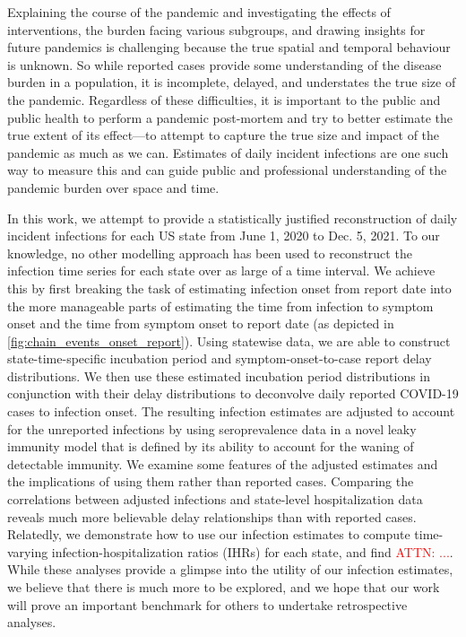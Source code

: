 \documentclass{article}
\newcommand{\attn }[1]{\textcolor{red}{ATTN: #1}}
\begin{document}
Explaining the course of the pandemic and investigating the effects of
interventions, the burden facing various subgroups, and drawing insights for
future pandemics is challenging because the true spatial and temporal behaviour
is unknown. So while reported cases provide some understanding of the disease
burden in a population, it is incomplete, delayed, and understates the true size
of the pandemic. Regardless of these difficulties, it is important to the public
and public health to perform a pandemic post-mortem and try to better estimate the
true extent of its effect---to attempt to capture the true size and impact of
the pandemic as much as we can. Estimates of daily incident infections are one
such way to measure this and can guide public and professional understanding of
the pandemic burden over space and time.

In this work, we attempt to provide a statistically justified reconstruction of daily
incident infections for each US state from June 1, 2020 to Dec. 5, 2021. To our knowledge,
no other modelling approach has been used to reconstruct the infection time series for
each state over as large of a time interval. We achieve this by first breaking the task of 
estimating infection onset from report date into the more manageable parts of estimating the time 
from infection to symptom onset and the time from symptom onset to report date (as depicted in
\autoref{fig:chain_events_onset_report}). Using statewise data, we are able to construct 
state-time-specific incubation period and symptom-onset-to-case report delay distributions. 
We then use these estimated incubation period distributions in conjunction with their 
delay distributions to deconvolve daily reported COVID-19 cases to infection onset.
The resulting infection estimates are adjusted to
account for the unreported infections by using seroprevalence data in a novel leaky 
immunity model that is defined by its ability to account for the waning of detectable immunity.  
We examine some features of the adjusted estimates and the implications of
using them rather than reported cases. Comparing the correlations between adjusted
infections and state-level hospitalization data reveals much more believable delay
relationships than with reported cases. Relatedly, we demonstrate how to use our infection
estimates to compute time-varying infection-hospitalization ratios (IHRs) for each state,
and find \attn {...}. While these analyses provide a glimpse into the utility of our
infection estimates, we believe that there is much more to be explored, and we hope that
our work will prove an important benchmark for others to undertake retrospective analyses.
\end{document}
